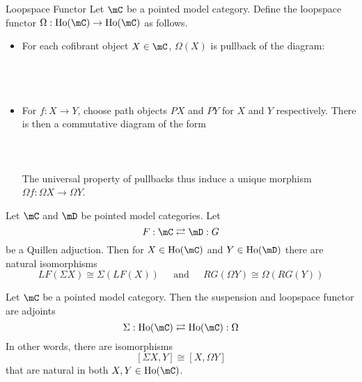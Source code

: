 \documentclass[a4paper]{article}
\begin{document}
\begin{defn}{Loopspace Functor}{} Let $\mC$ be a pointed model category. Define the loopspace functor $\Omega:\text{Ho}(\mC)\to\text{Ho}(\mC)$ as follows. 
\begin{itemize}
\item For each cofibrant object $X\in\mC$, $\Omega(X)$ is pullback of the diagram: \\~\\
\\~\\
\item For $f:X\to Y$, choose path objects $PX$ and $PY$ for $X$ and $Y$ respectively. There is then a commutative diagram of the form \\~\\
\\~\\
The universal property of pullbacks thus induce a unique morphism $\Omega f:\Omega X\to\Omega Y$. 
\end{itemize}
\end{defn}

\begin{prp}{}{} Let $\mC$ and $\mD$ be pointed model categories. Let $$F:\mC\rightleftarrows\mD:G$$ be a Quillen adjuction. Then for $X\in\text{Ho}(\mC)$ and $Y\in\text{Ho}(\mD)$ there are natural isomorphisms $$LF(\Sigma X)\cong\Sigma(LF(X))\;\;\;\;\text{ and }\;\;\;\; RG(\Omega Y)\cong\Omega(RG(Y))$$
\end{prp}

\begin{thm}{}{} Let $\mC$ be a pointed model category. Then the suspension and loopspace functor are adjoints $$\Sigma:\text{Ho}(\mC)\rightleftarrows\text{Ho}(\mC):\Omega$$ In other words, there are isomorphisms $$[\Sigma X,Y]\cong[X,\Omega Y]$$ that are natural in both $X,Y\in\text{Ho}(\mC)$. 
\end{thm}
\end{document}
